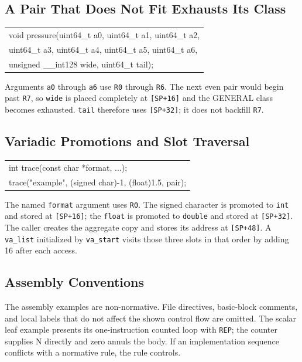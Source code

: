 \documentclass[10pt,twoside]{article}
\begin{document}
\subsection{A Pair That Does Not Fit Exhausts Its Class}
\begingroup\small\ttfamily
\begin{tabularx}{\linewidth}{@{}X@{}}
void pressure(uint64\_t a0, uint64\_t a1, uint64\_t a2,\tabularnewline
\hspace{1.2em}uint64\_t a3, uint64\_t a4, uint64\_t a5, uint64\_t a6,\tabularnewline
\hspace{1.2em}unsigned \_\_int128 wide, uint64\_t tail);\tabularnewline
\end{tabularx}
\endgroup
Arguments \texttt{a0} through \texttt{a6} use \texttt{R0} through
\texttt{R6}. The next even pair would begin past \texttt{R7}, so
\texttt{wide} is placed completely at \texttt{[SP+16]} and the GENERAL class
becomes exhausted. \texttt{tail} therefore uses \texttt{[SP+32]}; it does not
backfill \texttt{R7}.

\subsection{Variadic Promotions and Slot Traversal}
\begingroup\small\ttfamily
\begin{tabularx}{\linewidth}{@{}X@{}}
int trace(const char *format, ...);\tabularnewline
trace("example", (signed char)-1, (float)1.5, pair);\tabularnewline
\end{tabularx}
\endgroup
The named \texttt{format} argument uses \texttt{R0}. The signed character is
promoted to \texttt{int} and stored at \texttt{[SP+16]}; the \texttt{float} is
promoted to \texttt{double} and stored at \texttt{[SP+32]}. The caller creates
the aggregate copy and stores its address at \texttt{[SP+48]}. A
\texttt{va\_list} initialized by \texttt{va\_start} visits those three slots in
that order by adding 16 after each access.

\Needspace{1.8in}
\subsection{Assembly Conventions}
The assembly examples are non-normative. File directives, basic-block
comments, and local labels that do not affect the shown control flow are
omitted. The scalar leaf example presents its one-instruction counted loop with \texttt{REP}; the counter supplies
N directly and zero annuls the body. If an implementation sequence conflicts with a
normative rule, the rule controls.
\end{document}
